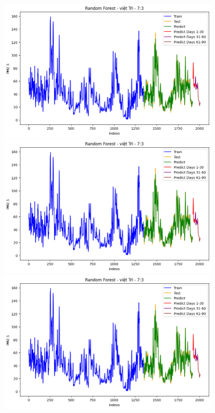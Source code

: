 \begin{figure}[H]
    \begin{minipage}{0.15\textwidth}
    \centering
    \includegraphics[width=1\textwidth]{img/final/RF/90D/RF_7_3_VT.png}
    \end{minipage}
    \hfill
    \begin{minipage}{0.15\textwidth}
    \centering
    \includegraphics[width=1\textwidth]{img/final/RF/90D/RF_7_3_VT.png}
    \end{minipage}
    \hfill
    \begin{minipage}{0.15\textwidth}
    \centering
    \includegraphics[width=1\textwidth]{img/final/RF/90D/RF_7_3_VT.png}
    \end{minipage}
    \hfill


\end{figure}
